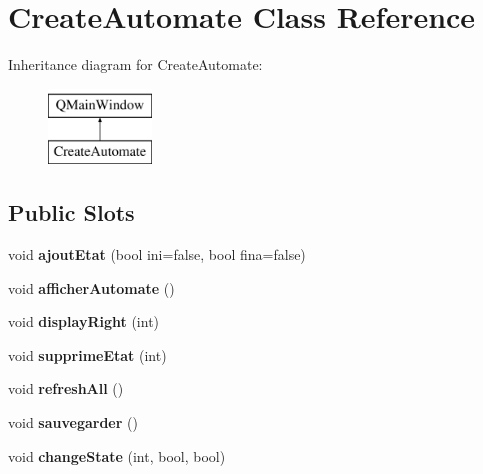 \hypertarget{class_create_automate}{\section{Create\-Automate Class Reference}
\label{class_create_automate}
}
Inheritance diagram for Create\-Automate\-:\begin{figure}[H]
\begin{center}
\leavevmode
\includegraphics[height=2.000000cm]{class_create_automate}
\end{center}
\end{figure}
\subsection*{Public Slots}
\begin{DoxyCompactItemize}
\item 
\hypertarget{class_create_automate_aa0b73cfa67f2921a14d69c8d7345ae53}{void {\bfseries ajout\-Etat} (bool ini=false, bool fina=false)}\label{class_create_automate_aa0b73cfa67f2921a14d69c8d7345ae53}

\item 
\hypertarget{class_create_automate_a66a9d64abf7e1ad5e4ac7611491d32e5}{void {\bfseries afficher\-Automate} ()}\label{class_create_automate_a66a9d64abf7e1ad5e4ac7611491d32e5}

\item 
\hypertarget{class_create_automate_a65385f4e187f8040945abf337a165630}{void {\bfseries display\-Right} (int)}\label{class_create_automate_a65385f4e187f8040945abf337a165630}

\item 
\hypertarget{class_create_automate_ae757fbbd26383fdf9d78b42905a4fb6a}{void {\bfseries supprime\-Etat} (int)}\label{class_create_automate_ae757fbbd26383fdf9d78b42905a4fb6a}

\item 
\hypertarget{class_create_automate_afda9720982becab25e51355c0e1e5d89}{void {\bfseries refresh\-All} ()}\label{class_create_automate_afda9720982becab25e51355c0e1e5d89}

\item 
\hypertarget{class_create_automate_a257c028c9d44547b9e3940b9260a1260}{void {\bfseries sauvegarder} ()}\label{class_create_automate_a257c028c9d44547b9e3940b9260a1260}

\item 
\hypertarget{class_create_automate_a433e2a76aaa801a883cdd76195987c7d}{void {\bfseries change\-State} (int, bool, bool)}\label{class_create_automate_a433e2a76aaa801a883cdd76195987c7d}

\end{DoxyCompactItemize}
